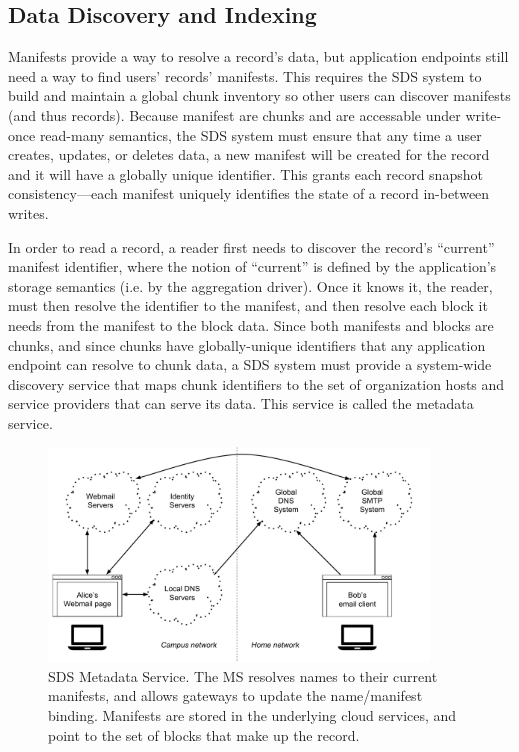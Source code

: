 \subsection{Data Discovery and Indexing}
\label{sec:metadata-service}

Manifests provide a way to resolve a record's data, but application endpoints
still need a way to find users' records' manifests.
This requires the SDS system to build and maintain a global
chunk inventory so other users can discover manifests (and thus records).
Because manifest are chunks and are accessable under write-once read-many semantics,
the SDS system must ensure that any time a user creates, updates, or deletes
data, a new manifest will be created for the record and it will have a globally unique
identifier.  This grants each record snapshot consistency---each manifest
uniquely identifies the state of a record in-between writes.

In order to read a record, a reader first
needs to discover the record's ``current'' manifest identifier, where the notion
of ``current'' is defined by the application's storage semantics (i.e. by the
aggregation driver).  Once it knows it, the reader, must then resolve the
identifier to the manifest, and then resolve each block it needs from the
manifest to the block data.  Since both manifests and blocks are chunks,
and since chunks have globally-unique identifiers that any application endpoint
can resolve to chunk data, a SDS
system must provide a system-wide discovery service that maps chunk identifiers to the set of
organization hosts and service providers that can serve its data.
This service is called the metadata service.

\begin{figure}[h]
   \centering
   \includegraphics[width=0.9\textwidth,page=5]{figures/dissertation-figures}
   \caption{SDS Metadata Service.  The MS resolves names to their current
   manifests, and allows gateways to update the name/manifest binding.
   Manifests are stored in the underlying cloud services, and
   point to the set of blocks that make up the record.}
   \label{fig:chap2-metadata-service}
\end{figure}

